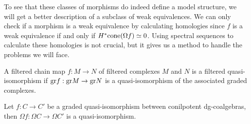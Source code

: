 \documentclass[../thesis.tex]{subfiles}
\begin{document}
            To see that these classes of morphisms do indeed define a model structure, we will get a better description of a subclass of weak equivalences. We can only check if a morphism is a weak equivalence by calculating homologies since $f$ is a weak equivalence if and only if $H^*\tt{cone}(\Omega f) \simeq 0$. Using spectral sequences to calculate these homologies is not crucial, but it gives us a method to handle the problems we will face.

            \begin{definition}
                A filtered chain map $f: M \rightarrow N$ of filtered complexes $M$ and $N$ is a filtered quasi-isomorphism if $\tt{gr}f: \tt{gr}M \rightarrow \tt{gr}N$ is a quasi-isomorphism of the associated graded complexes.
            \end{definition}

            \begin{lemma}\label{lem: graded-qif-are-w}
                Let $f: C\rightarrow C'$ be a graded quasi-isomorphism between conilpotent dg-coalgebras, then $\Omega f: \Omega C \rightarrow \Omega C'$ is a quasi-isomorphism. 
            \end{lemma}
\end{document}
